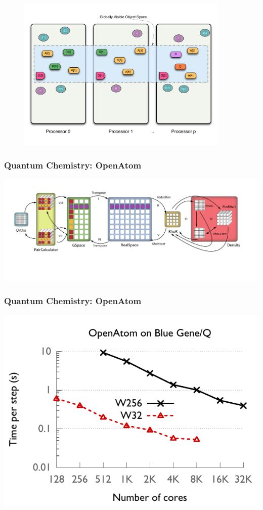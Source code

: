 \begin{frame}
  \frametitle{
  }
  \begin{figure}\includegraphics[width=0.9\textwidth]{../figures/progmodel/07-obj-programmer-view.pdf}\end{figure}
\end{frame}


\begin{frame}
\frametitle{Quantum Chemistry: OpenAtom}
\includegraphics[width=\textwidth]{../figures/openatom/control-flow.pdf}
\end{frame}


\begin{frame}
\frametitle{Quantum Chemistry: OpenAtom}
\includegraphics[width=\textwidth]{../figures/openatom/bgq.pdf}
\end{frame}



